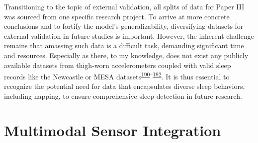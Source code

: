 \documentclass[
  10pt,
]{scrbook}
\begin{document}
Transitioning to the topic of external validation, all splits of data
for Paper III was sourced from one specific research project. To arrive
at more concrete conclusions and to fortify the model's
generalizability, diversifying datasets for external validation in
future studies is important. However, the inherent challenge remains
that amassing such data is a difficult task, demanding significant time
and resources. Especially as there, to my knowledge, does not exist any
publicly available datasets from thigh-worn accelerometers coupled with
valid sleep records like the Newcastle or MESA
datasets\textsuperscript{\protect\hyperlink{ref-hees_newcastle_2018}{190}--\protect\hyperlink{ref-chen_2015}{192}}.
It is thus essential to recognize the potential need for data that
encapsulates diverse sleep behaviors, including napping, to ensure
comprehensive sleep detection in future research.

\hypertarget{multimodal-sensor-integration}{%
\section{Multimodal Sensor
Integration}\label{multimodal-sensor-integration}}
\end{document}
